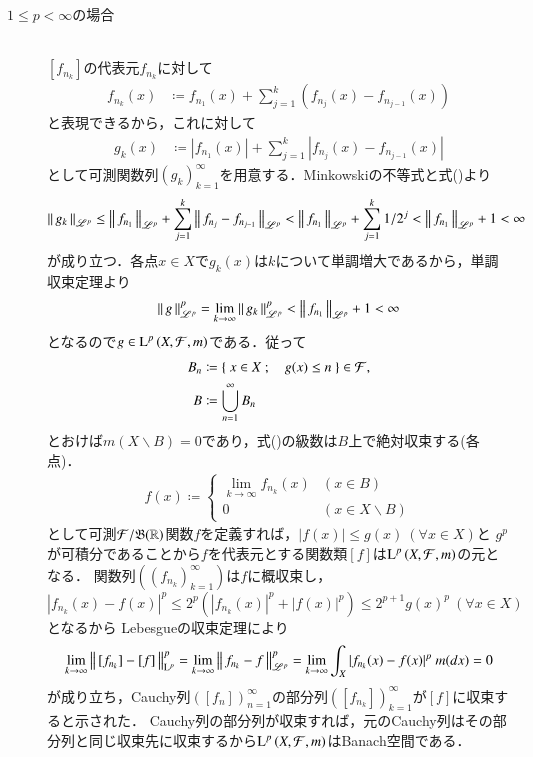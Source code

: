 \begin{prf}
\begin{description}
		\item[$1 \leq p < \infty$の場合]\mbox{}\\
			$[f_{n_k}]$の代表元$f_{n_k}$に対して
			\begin{align}	
				f_{n_k}(x) &\coloneqq f_{n_1}(x) + \sum_{j=1}^{k}(f_{n_j}(x) - f_{n_{j-1}}(x)) \label{eq:Lp_banach_3}
			\end{align}
			と表現できるから，これに対して
			\begin{align}
				g_k(x) &\coloneqq |f_{n_1}(x)| + \sum_{j=1}^{k}|f_{n_j}(x) - f_{n_{j-1}}(x)|
			\end{align}
			として可測関数列$(g_k)_{k=1}^{\infty}$を用意する．Minkowskiの不等式と式()より
			\begin{align}
				\left\|\, g_k\, \right\|_{\mathscr{L}^p} \leq \left\|\, f_{n_1}\, \right\|_{\mathscr{L}^p} + \sum_{j=1}^{k}\left\|\, f_{n_j} - f_{n_{j-1}}\, \right\|_{\mathscr{L}^p}
				< \left\|\, f_{n_1}\, \right\|_{\mathscr{L}^p} + \sum_{j=1}^{k} 1/2^j < \left\|\, f_{n_1}\, \right\|_{\mathscr{L}^p} + 1 < \infty
			\end{align}
			が成り立つ．各点$x \in X$で$g_k(x)$は$k$について単調増大であるから，単調収束定理より
			\begin{align}
				\left\|\, g\, \right\|_{\mathscr{L}^p}^p = \lim_{k \to \infty} \left\|\, g_k\, \right\|_{\mathscr{L}^p}^p < \left\|\, f_{n_1}\, \right\|_{\mathscr{L}^p} + 1 < \infty
			\end{align}
			となるので$g \in \operatorname{L}^{p} \left(X,\mathcal{F},m\right)$である．従って
			\begin{align}
				B_n &\coloneqq \left\{\ x \in X\ ;\quad g(x) \leq n\ \right\} \in \mathcal{F}, \\
				B &\coloneqq \bigcup_{n=1}^{\infty} B_n
			\end{align}
			とおけば$m(X \backslash B) = 0$であり，式()の級数は$B$上で絶対収束する(各点)．
			\begin{align}
				f(x) \coloneqq
				\begin{cases}
					\lim\limits_{k \to \infty} f_{n_k}(x) & (x \in B) \\
					0 & (x \in X \backslash B)
				\end{cases}
			\end{align}
			として可測$\mathcal{F}/\mathfrak{B}(\mathbb{R})$関数$f$を定義すれば，$|f(x)| \leq g(x)\ (\forall x \in X)$と
			$g^p$が可積分であることから$f$を代表元とする関数類$[f]$は$\operatorname{L}^{p} \left(X,\mathcal{F},m\right)$の元となる．
			関数列$(\left( f_{n_k} \right)_{k=1}^{\infty})$は$f$に概収束し，
			$|f_{n_k}(x) - f(x)|^p \leq 2^p(|f_{n_k}(x)|^p + |f(x)|^p) \leq 2^{p+1} g(x)^p\ (\forall x \in X)$となるから
			Lebesgueの収束定理により
			\begin{align}
				\lim_{k \to \infty}\Norm{[f_{n_k}] - [f]}{\mathrm{L}^p}^p
				= \lim_{k \to \infty}\Norm{f_{n_k} - f}{\mathscr{L}^p}^p
				= \lim_{k \to \infty} \int_X |f_{n_k}(x) - f(x)|^p\ m(dx) = 0
			\end{align}
			が成り立ち，Cauchy列$\left( [f_{n}] \right)_{n=1}^{\infty}$の部分列$\left( [f_{n_k}] \right)_{k=1}^{\infty}$が$[f]$に収束すると示された．
			Cauchy列の部分列が収束すれば，元のCauchy列はその部分列と同じ収束先に収束するから$\operatorname{L}^{p} \left(X,\mathcal{F},m\right)$はBanach空間である．
	\end{description}
	\QED
\end{prf}
